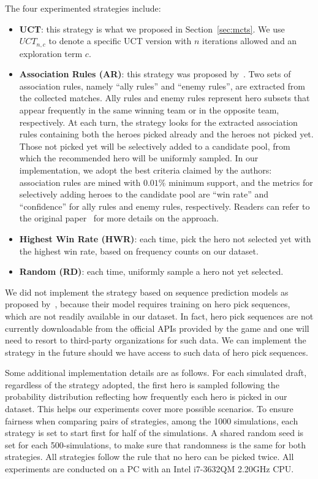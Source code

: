 The four experimented strategies include:
\begin{itemize}
\item \textbf{UCT}: this strategy is what we proposed in Section~\ref{sec:mcts}. We  use $UCT_{n,c}$ to denote a specific UCT version with $n$ iterations allowed and an exploration term $c$. 
\item \textbf{Association Rules (AR)}: this strategy was proposed by~\textcite{hanke2017reco}. Two sets of association rules, namely ``ally rules'' and ``enemy rules'', are extracted from the collected matches. Ally rules and enemy rules represent hero subsets that appear frequently in the same winning team or in the opposite team, respectively. At each turn, the strategy looks for the extracted association rules containing both the heroes picked already and the heroes not picked yet. Those not picked yet will be selectively added to a candidate pool, from which the recommended hero will be uniformly sampled. In our implementation, we adopt the best criteria claimed by the authors: association rules are mined with $0.01\%$ minimum support, and the metrics for selectively adding heroes to the candidate pool are ``win rate'' and ``confidence'' for ally rules and enemy rules, respectively. Readers can refer to the original paper~\cite{hanke2017reco} for more details on the approach. 
\item \textbf{Highest Win Rate (HWR)}: each time, pick the hero not selected yet with the highest win rate, based on frequency counts on our dataset. 
\item \textbf{Random (RD)}: each time, uniformly sample a hero not yet selected. 
\end{itemize}

We did not implement the strategy based on sequence prediction models as proposed by~\textcite{summerville2017reco}, because their model requires training on hero pick sequences, which are not readily available in our dataset. In fact, hero pick sequences are not currently downloadable from the official APIs provided by the game and one will need to resort to third-party organizations for such data. We can implement the strategy in the future should we have access to such data of hero pick sequences.

Some additional implementation details are as follows. For each simulated draft, regardless of the strategy adopted, the first hero is sampled following the probability distribution reflecting how frequently each hero is picked in our dataset. This helps our experiments cover more possible scenarios. To ensure fairness when comparing pairs of strategies, among the 1000 simulations, each strategy is set to start first for half of the simulations. A shared random seed is set for each 500-simulations, to make sure that randomness is the same for both strategies. All strategies follow the rule that no hero can be picked twice. All experiments are conducted on a PC with an Intel i7-3632QM 2.20GHz CPU.

